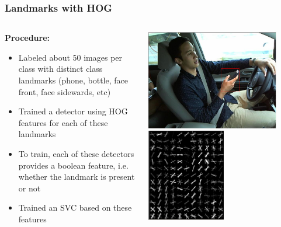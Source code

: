 \documentclass{beamer}
\begin{document}
	\begin{frame}
		\frametitle{Landmarks with HOG}		
		\begin{columns}
			\begin{column}{0.5\textwidth}
                \textbf{Procedure:}
				\begin{itemize}
					\item Labeled about 50 images per class with distinct class landmarks (phone, bottle, face front, face sidewards, etc)
					\item Trained a detector using HOG features for each of these landmarks
					\item To train, each of these detectors provides a boolean feature, i.e. whether the landmark is present or not
					\item Trained an SVC based on these features					
				\end{itemize}
			\end{column}
			\begin{column}{0.5\textwidth}
				\begin{center}
					\includegraphics[width=0.85\textwidth]{mult_HOG/HOG_phone_det}\\
					\includegraphics[width=0.5\textwidth]{mult_HOG/HOG_phone}
				\end{center}
			\end{column}
		\end{columns}
		
	\end{frame}
\end{document}
